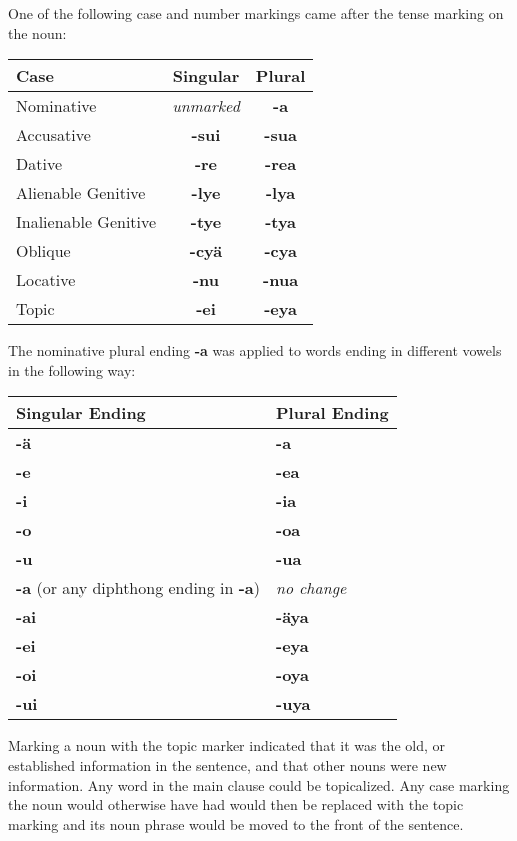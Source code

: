 \documentclass{article}
\begin{document}
One of the following case and number markings came after the tense marking on the noun:

\begin{table}[h]
\begin{tabular}{l| c c}
Case & Singular & Plural \\
\hline
Nominative & \emph{unmarked} & \textbf{-a} \\
Accusative & \textbf{-sui} & \textbf{-sua} \\
Dative & \textbf{-re} & \textbf{-rea} \\
Alienable Genitive & \textbf{-lye} & \textbf{-lya} \\
Inalienable Genitive & \textbf{-tye} & \textbf{-tya} \\
Oblique & \textbf{-cy\"a} & \textbf{-cya} \\
Locative & \textbf{-nu} & \textbf{-nua} \\
Topic & \textbf{-ei} & \textbf{-eya} \\
\end{tabular}
\end{table}

\newpage

The nominative plural ending \textbf{-a} was applied to words ending in different vowels in the following way:

\begin{table}[h]
\begin{tabular}{l|l}
Singular Ending & Plural Ending \\
\hline
\textbf{-\"a} & \textbf{-a} \\
\textbf{-e} & \textbf{-ea} \\
\textbf{-i} & \textbf{-ia} \\
\textbf{-o} & \textbf{-oa} \\
\textbf{-u} & \textbf{-ua} \\
\textbf{-a} (or any diphthong ending in \textbf{-a}) & \emph{no change} \\
\textbf{-ai} & \textbf{-\"aya} \\
\textbf{-ei} & \textbf{-eya} \\
\textbf{-oi} & \textbf{-oya} \\
\textbf{-ui} & \textbf{-uya} \\
\end{tabular}
\end{table}

Marking a noun with the topic marker indicated that it was the old, or established information in the sentence, and that other nouns were new information.  Any word in the main clause could be topicalized.  Any case marking the noun would otherwise have had would then be replaced with the topic marking and its noun phrase would be moved to the front of the sentence.
\end{document}

